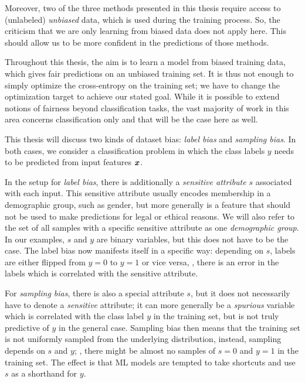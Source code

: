 Moreover, two of the three methods presented in this thesis require access to (unlabeled) \emph{unbiased} data,
which is used during the training process.
So, the criticism that we are only learning from biased data does not apply here.
This should allow us to be more confident in the predictions of those methods.

Throughout this thesis, the aim is to learn a model from biased training data,
which gives fair predictions on an unbiased training set.
It is thus not enough to simply optimize the cross-entropy on the training set;
we have to change the optimization target to achieve our stated goal.
While it is possible to extend notions of fairness beyond classification tasks,
the vast majority of work in this area concerns classification only and that will be the case here as well.

This thesis will discuss two kinds of dataset bias: \emph{label bias} and \emph{sampling bias}.
In both cases,
we consider a classification problem in which the class labels $y$ needs to be predicted from input features ${\bm{x}}$.

In the setup for \emph{label bias},
there is additionally a \emph{sensitive attribute} $s$ associated with each input.
This sensitive attribute usually encodes membership in a demographic group, such as gender,
but more generally is a feature that should not be used to make predictions for legal or ethical reasons.
We will also refer to the set of all samples with a specific sensitive attribute as one \emph{demographic group}.
In our examples, $s$ and $y$ are binary variables, but this does not have to be the case.
The label bias now manifests itself in a specific way:
depending on $s$, labels are either flipped from $y=0$ to $y=1$ or vice versa,
\ie, there is an error in the labels which is correlated with the sensitive attribute.

For \emph{sampling bias},
there is also a special attribute $s$, but it does not necessarily have to denote a \emph{sensitive} attribute;
it can more generally be a \emph{spurious} variable which is correlated with the class label $y$ in the training set,
but is not truly predictive of $y$ in the general case.
Sampling bias then means that the training set is not uniformly sampled from the underlying distribution,
instead, sampling depends on $s$ and $y$;
\eg, there might be almost no samples of $s=0$ and $y=1$ in the training set.
The effect is that \ac{ML} models are tempted to take shortcuts and use $s$ as a shorthand for $y$.

